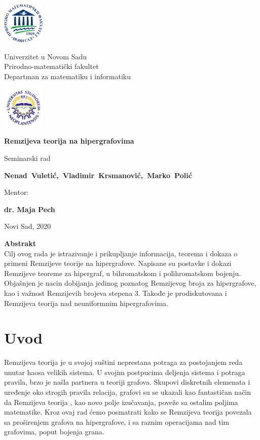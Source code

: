 \documentclass[a4paper]{article}
\newcommand{\autor}{ \flushleft\mbox{Nenad Vuletić, Vladimir Krsmanović, Marko Polić} }
\newcommand{\naslov}{Remzijeva teorija na hipergrafovima}
\newcommand{\datum}{Novi Sad, 2020}
\newcommand{\mentor}{dr. Maja Pech}
\begin{document}
	\begin{center}
		
		\includegraphics[width=2cm]{grbPMF}\hfill
		\parbox[b]{45ex}{\centering 
			Univerzitet u Novom Sadu\\
			Prirodno-matematički fakultet\\
			Departman za matematiku i informatiku}\hfill 
		\includegraphics[width=2cm]{grbUNS}
		
		\vspace{22ex}
				
		{\Huge {\bf \setlength{\baselineskip}{1.5\baselineskip}\naslov}}
		
		\vspace{4ex}
		Seminarski rad
		\vfill	
		\parbox[b]{\textwidth}{{\Large {\bf \hspace{1cm}\autor}}}
		\vspace{10ex}
		
		{\Large Mentor:}
		
		{\Large  \textbf{\mentor}}
		\vspace{5ex}
	
		
		\datum
		
	\end{center}
	\thispagestyle{empty}
	\newpage	
	\vfill
	\begin{center}
		\textbf{Abstrakt}\\
		Cilj ovog rada je istrazivanje i prikupljanje informacija, teorema i dokaza o primeni Remzijeve teorije na hipergrafove. Napisane su postavke i dokazi Remzijeve teoreme za hipergraf, u bihromatskom i polihromatskom bojenju. Objašnjen je nacin dobijanja jedinog poznatog Remzijevog broja za hipergrafove, kao i važnost Remzijevih brojeva stepena 3. Takođe je prodiskutovana i Remzijeva teorija nad neuniformnim hipergrafovima.
		\thispagestyle{empty}
	\end{center}
	\vspace{15ex}
	\tableofcontents
	\newpage
	\section{Uvod}
	Remzijeva teorija je u svojoj suštini neprestana potraga za postojanjem reda unutar haosa velikih sistema. U svojim postpucima deljenja sistema i potraga pravila, brzo je našla partnera u teoriji grafova. Skupovi diskretnih elemenata i uređenje oko strogih pravila relacija, grafovi su se ukazali kao fantastičan način da Remzijeva teorija , kao novo polje izučavanja, poveže sa ostalim poljima matematike. Kroz ovaj rad ćemo posmatrati kako se Remzijeva teorija povezala sa proširenjem grafova na hipergrafove, i sa raznim operacijama nad tim grafovima, poput bojenja grana.
\end{document}
